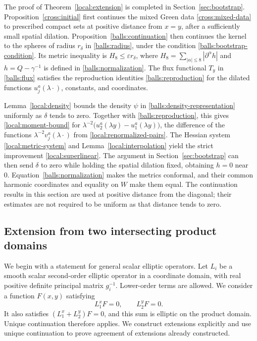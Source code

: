 \documentclass[11pt,a4paper]{article}
\theoremstyle{definition}
\theoremstyle{remark}
\newcommand{\eps}{\varepsilon}
\numberwithin{equation}{section}
\begin{document}
The proof of Theorem~\ref{local:extension} is completed in
Section~\ref{sec:bootstrap}. Proposition~\ref{cross:initial} first
continues the mixed Green data \eqref{cross:mixed-data} to prescribed
compact sets at positive distance from $x=y$, after a sufficiently
small spatial dilation. Proposition~\ref{balls:continuation} then
continues the kernel to the spheres of radius $r_\delta$ in
\eqref{balls:radius}, under the condition
\eqref{balls:bootstrap-condition}. Its metric inequality is
$H_8\le\eps r_\delta$, where
$H_8=\sum_{|\alpha|\le8}|\partial^\alpha h|$ and
$h=Q-\gamma^{-1}$ is defined in \eqref{balls:normalization}.
The flux functional $T_y$ in \eqref{balls:flux} satisfies the
reproduction identities \eqref{balls:reproduction} for the dilated
functions $u_j^a(\lambda\cdot)$, constants, and coordinates.

Lemma~\ref{local:density} bounds the density $\psi$ in
\eqref{balls:density-representation} uniformly as $\delta$ tends to
zero. Together with \eqref{balls:reproduction}, this gives
\eqref{local:moment-bound} for
$\lambda^{-2}\bigl(u_2^a(\lambda y)-u_1^a(\lambda y)\bigr)$, the
difference of the functions $\lambda^{-2}v_j^a(\lambda\cdot)$
from \eqref{local:renormalized-pairs}.
The Hessian system \eqref{local:metric-system} and
Lemma~\ref{local:interpolation} yield the strict improvement
\eqref{local:superlinear}. The argument in
Section~\ref{sec:bootstrap} can then send $\delta$ to zero while
holding the spatial dilation fixed, obtaining $h=0$ near $0$.
Equation~\eqref{balls:normalization} makes the metrics conformal, and
their common harmonic coordinates and equality on $W$ make them equal.
The continuation results in this section are used at positive distance
from the diagonal; their estimates are not required to be uniform as
that distance tends to zero.

\subsection{Extension from two intersecting product domains}

We begin with a statement for general scalar elliptic operators. Let
$L_i$ be a smooth scalar second-order elliptic operator in a coordinate
domain, with real positive definite principal matrix $g_i^{-1}$.
Lower-order terms are allowed. We consider a function $F(x,y)$
satisfying
\[
 L_1^xF=0,\qquad L_2^yF=0.
\]
It also satisfies $(L_1^x+L_2^y)F=0$, and this sum is elliptic
on the product domain. Unique continuation therefore applies.
We construct extensions explicitly and use unique continuation to
prove agreement of extensions already constructed.
\end{document}
